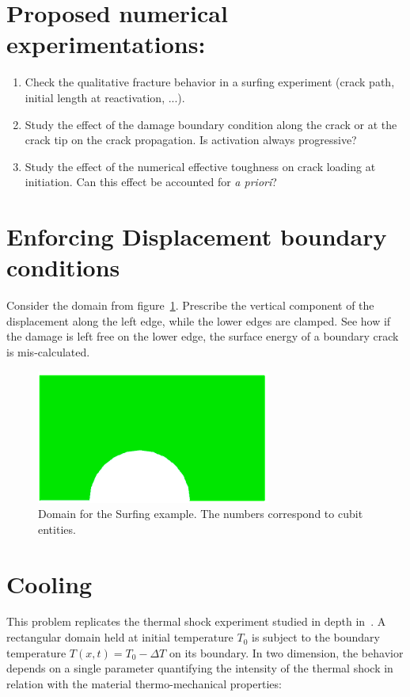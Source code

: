 \documentclass[10pt,oneside]{report}
\begin{document}
\section*{Proposed numerical experimentations:}
\begin{enumerate}
\item Check the qualitative fracture behavior in a surfing experiment (crack path, initial length at reactivation, ...).
\item Study the effect of the damage boundary condition along the crack or at the crack tip on the crack propagation. Is activation always progressive?
\item Study the effect of the numerical effective toughness on crack loading at initiation. Can this effect be accounted for \emph{a priori}?
\end{enumerate}

\section{Enforcing Displacement boundary conditions}
Consider the domain from figure~\ref{fig:BC}. Prescribe the vertical component of the displacement along the left edge, while the lower edges are clamped. See how if the damage is left free on the lower edge, the surface energy of a boundary crack is mis-calculated.
\begin{figure}[H]
\centering
\includegraphics[width=.45\textwidth]{Examples/BC/Geometry.png}
\caption{Domain for the Surfing example. The numbers correspond to cubit entities.}
\label{fig:BC}
\end{figure}



\section{Cooling}
This problem replicates the thermal shock experiment studied in depth in~\cite{Sicsic-Marigo-2013a,Bourdin-Marigo-EtAl-2014a}. A rectangular domain held at initial temperature $T_0$ is subject to the boundary temperature $T(x,t) = T_0 - \Delta T$ on its boundary. In two dimension, the behavior depends on a single parameter quantifying the intensity of the thermal shock in relation with the material thermo-mechanical properties:
\end{document}

